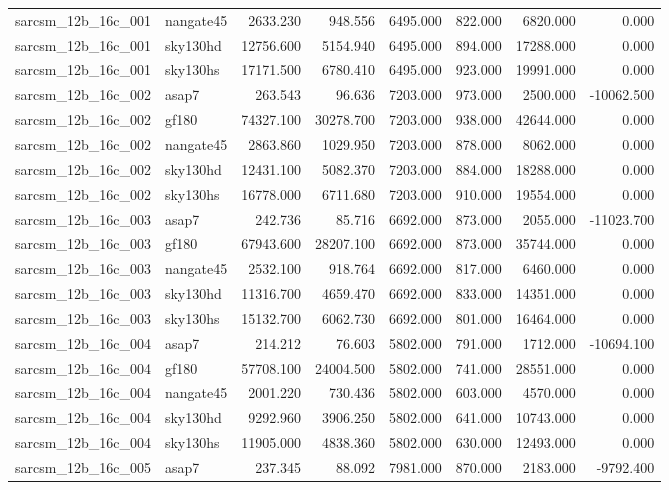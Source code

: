 \begin{tabular}{llrrrrrr}
sarcsm\_12b\_16c\_001 & nangate45 & 2633.230 & 948.556 & 6495.000 & 822.000 & 6820.000 & 0.000 \\
sarcsm\_12b\_16c\_001 & sky130hd & 12756.600 & 5154.940 & 6495.000 & 894.000 & 17288.000 & 0.000 \\
sarcsm\_12b\_16c\_001 & sky130hs & 17171.500 & 6780.410 & 6495.000 & 923.000 & 19991.000 & 0.000 \\
sarcsm\_12b\_16c\_002 & asap7 & 263.543 & 96.636 & 7203.000 & 973.000 & 2500.000 & -10062.500 \\
sarcsm\_12b\_16c\_002 & gf180 & 74327.100 & 30278.700 & 7203.000 & 938.000 & 42644.000 & 0.000 \\
sarcsm\_12b\_16c\_002 & nangate45 & 2863.860 & 1029.950 & 7203.000 & 878.000 & 8062.000 & 0.000 \\
sarcsm\_12b\_16c\_002 & sky130hd & 12431.100 & 5082.370 & 7203.000 & 884.000 & 18288.000 & 0.000 \\
sarcsm\_12b\_16c\_002 & sky130hs & 16778.000 & 6711.680 & 7203.000 & 910.000 & 19554.000 & 0.000 \\
sarcsm\_12b\_16c\_003 & asap7 & 242.736 & 85.716 & 6692.000 & 873.000 & 2055.000 & -11023.700 \\
sarcsm\_12b\_16c\_003 & gf180 & 67943.600 & 28207.100 & 6692.000 & 873.000 & 35744.000 & 0.000 \\
sarcsm\_12b\_16c\_003 & nangate45 & 2532.100 & 918.764 & 6692.000 & 817.000 & 6460.000 & 0.000 \\
sarcsm\_12b\_16c\_003 & sky130hd & 11316.700 & 4659.470 & 6692.000 & 833.000 & 14351.000 & 0.000 \\
sarcsm\_12b\_16c\_003 & sky130hs & 15132.700 & 6062.730 & 6692.000 & 801.000 & 16464.000 & 0.000 \\
sarcsm\_12b\_16c\_004 & asap7 & 214.212 & 76.603 & 5802.000 & 791.000 & 1712.000 & -10694.100 \\
sarcsm\_12b\_16c\_004 & gf180 & 57708.100 & 24004.500 & 5802.000 & 741.000 & 28551.000 & 0.000 \\
sarcsm\_12b\_16c\_004 & nangate45 & 2001.220 & 730.436 & 5802.000 & 603.000 & 4570.000 & 0.000 \\
sarcsm\_12b\_16c\_004 & sky130hd & 9292.960 & 3906.250 & 5802.000 & 641.000 & 10743.000 & 0.000 \\
sarcsm\_12b\_16c\_004 & sky130hs & 11905.000 & 4838.360 & 5802.000 & 630.000 & 12493.000 & 0.000 \\
sarcsm\_12b\_16c\_005 & asap7 & 237.345 & 88.092 & 7981.000 & 870.000 & 2183.000 & -9792.400 \\

\end{tabular}
